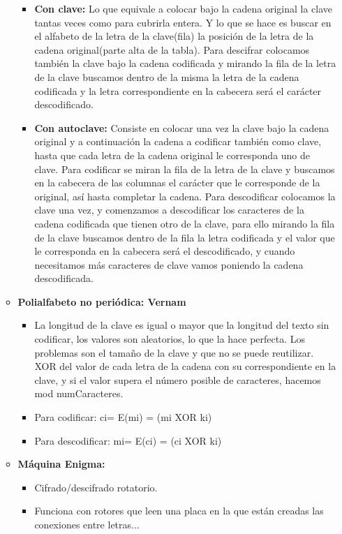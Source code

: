 \documentclass[12pt, twoside, openright]{report} %
\begin{document}
\begin{itemize}
\begin{itemize}
\begin{itemize}
			            \item \textbf{Con clave:} Lo que equivale a colocar bajo la cadena original la clave tantas veces como para cubrirla entera. Y lo que se hace es buscar en el alfabeto de la letra de la clave(fila) la posición de la letra de la cadena original(parte alta de la tabla). Para descifrar colocamos también la clave bajo la cadena codificada y mirando la fila de la letra de la clave buscamos dentro de la misma la letra de la cadena codificada y la letra correspondiente en la cabecera será el carácter descodificado.
			            \item \textbf{Con autoclave:} Consiste en colocar una vez la clave bajo la cadena original y a continuación la cadena a codificar también como clave, hasta que cada letra de la cadena original le corresponda uno de clave. Para codificar se miran la fila de la letra de la clave y buscamos en la cabecera de las columnas el carácter que le corresponde de la original, así hasta completar la cadena. Para descodificar colocamos la clave una vez, y comenzamos a descodificar los caracteres de la cadena codificada que tienen otro de la clave, para ello mirando la fila de la clave buscamos dentro de la fila la letra codificada y el valor que le corresponda en la cabecera será el descodificado, y cuando necesitamos más caracteres de clave vamos poniendo la cadena descodificada.
		            \end{itemize}
		      \item \textbf{Polialfabeto no periódica: Vernam}
		            \begin{itemize}
			            \item La longitud de la clave es igual o mayor que la longitud del texto sin codificar, los valores son aleatorios, lo que la hace perfecta. Los problemas son el tamaño de la clave y que no se puede reutilizar. XOR del valor de cada letra de la cadena con su correspondiente en la clave, y si el valor supera el número posible de caracteres, hacemos mod numCaracteres.
			            \item Para codificar: ci= E(mi) = (mi XOR ki)
			            \item Para descodificar: mi= E(ci) = (ci XOR ki)
		            \end{itemize}
		      \item \textbf{Máquina Enigma:}
		            \begin{itemize}
			            \item Cifrado/descifrado rotatorio.
			            \item Funciona con rotores que leen una placa en la que están creadas las conexiones entre letras...

\end{itemize}
\end{itemize}
\end{itemize}
\end{document}
